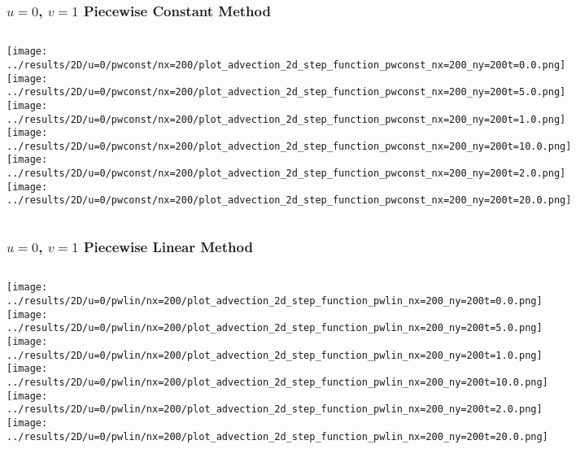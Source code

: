\begin{frame}
	\frametitle{$u = 0$, $v = 1$ Piecewise Constant Method}
	\begin{columns}
		\centering
		\texttt{[image: ../results/2D/u=0/pwconst/nx=200/plot\_advection\_2d\_step\_function\_pwconst\_nx=200\_ny=200t=0.0.png]}\\
		\texttt{[image: ../results/2D/u=0/pwconst/nx=200/plot\_advection\_2d\_step\_function\_pwconst\_nx=200\_ny=200t=5.0.png]}
		\centering
		\texttt{[image: ../results/2D/u=0/pwconst/nx=200/plot\_advection\_2d\_step\_function\_pwconst\_nx=200\_ny=200t=1.0.png]}\\
		\texttt{[image: ../results/2D/u=0/pwconst/nx=200/plot\_advection\_2d\_step\_function\_pwconst\_nx=200\_ny=200t=10.0.png]}
		\centering
		\texttt{[image: ../results/2D/u=0/pwconst/nx=200/plot\_advection\_2d\_step\_function\_pwconst\_nx=200\_ny=200t=2.0.png]}\\
		\texttt{[image: ../results/2D/u=0/pwconst/nx=200/plot\_advection\_2d\_step\_function\_pwconst\_nx=200\_ny=200t=20.0.png]}
	\end{columns}
\end{frame}


\begin{frame}
	\frametitle{$u = 0$, $v = 1$ Piecewise Linear Method}
	\begin{columns}
		\column{.33\textwidth}
			\centering
			\texttt{[image: ../results/2D/u=0/pwlin/nx=200/plot\_advection\_2d\_step\_function\_pwlin\_nx=200\_ny=200t=0.0.png]}\\
			\texttt{[image: ../results/2D/u=0/pwlin/nx=200/plot\_advection\_2d\_step\_function\_pwlin\_nx=200\_ny=200t=5.0.png]}
		\column{.33\textwidth}
			\centering
			\texttt{[image: ../results/2D/u=0/pwlin/nx=200/plot\_advection\_2d\_step\_function\_pwlin\_nx=200\_ny=200t=1.0.png]}\\
			\texttt{[image: ../results/2D/u=0/pwlin/nx=200/plot\_advection\_2d\_step\_function\_pwlin\_nx=200\_ny=200t=10.0.png]}
		\column{.33\textwidth}
			\centering
			\texttt{[image: ../results/2D/u=0/pwlin/nx=200/plot\_advection\_2d\_step\_function\_pwlin\_nx=200\_ny=200t=2.0.png]}\\
			\texttt{[image: ../results/2D/u=0/pwlin/nx=200/plot\_advection\_2d\_step\_function\_pwlin\_nx=200\_ny=200t=20.0.png]}
	\end{columns}
\end{frame}


